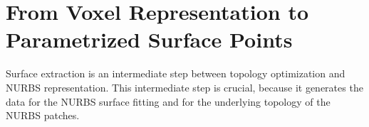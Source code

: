 \section{From Voxel Representation to Parametrized Surface Points}
\label{sec:surfaceImpl}
Surface extraction is an intermediate step between topology optimization and \ac{NURBS} representation. This intermediate step is crucial, because it generates the data for the \ac{NURBS} surface fitting and for the underlying topology of the \ac{NURBS} patches.




\begin{comment}




The VTK Toolbox is an open-source tool, providing algorithms for "3D computer graphics, image processing, and visualization" \cite{VTKToolbox}. Among the variety of tools, VTK offers algorithms that allow us to obtain a surface representation from voxel data. Among these algorithms, we could find Marching Cubes, Dual Contouring and also a Decimation tool, the last of which can useful for reducing the data size further for the NURBS-representation step.



\end{comment}
